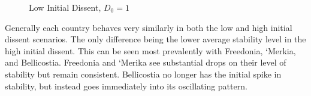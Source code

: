 \documentclass[12pt]{article}
\begin{document}
\begin{spacing}{1.5}
\begin{figure}[htb]
\centering 
{} 
\caption{Low Initial Dissent, $D_0=1$}
\end{figure}

Generally each country behaves very similarly in both the low and high initial dissent scenarios. The only difference being the lower average stability level in the high initial dissent. This can be seen most prevalently with Freedonia, `Merkia, and Bellicostia. Freedonia and `Merika see substantial drops on their level of stability but remain consistent. Bellicostia no longer has the initial spike in stability, but instead goes immediately into its oscillating pattern. 


\end{spacing}
\end{document}
